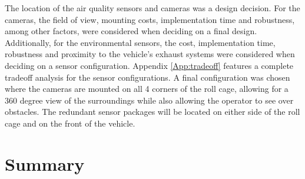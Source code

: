 The location of the air quality sensors and cameras was a design decision. For the cameras, the field of view, mounting costs, implementation time and robustness, among other factors, were considered when deciding on a final design. Additionally, for the environmental sensors, the cost, implementation time, robustness and proximity to the vehicle's exhaust systems were considered when deciding on a sensor configuration. Appendix \ref{App:tradeoff} features a complete tradeoff analysis for the sensor configurations. A final configuration was chosen where the cameras are mounted on all 4 corners of the roll cage, allowing for a 360 degree view of the surroundings while also allowing the operator to see over obstacles. The redundant sensor packages will be located on either side of the roll cage and on the front of the vehicle. 

\section{Summary}